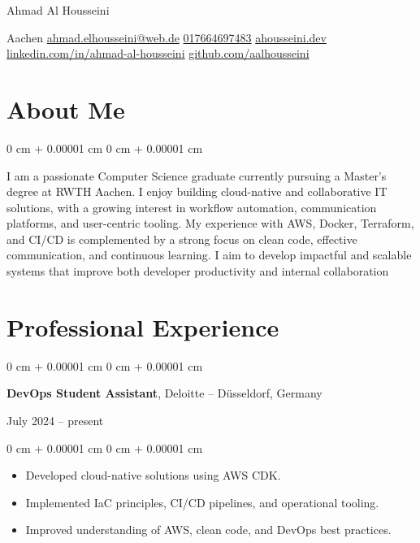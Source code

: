 \documentclass[10pt, letterpaper]{article}
\newenvironment{highlights}{
    \begin{itemize}[
        topsep=0.10 cm,
        parsep=0.10 cm,
        partopsep=0pt,
        itemsep=0pt,
        leftmargin=0 cm + 10pt
    ]
}{
    \end{itemize}
} %
\newenvironment{onecolentry}{
    \begin{adjustwidth}{
        0 cm + 0.00001 cm
    }{
        0 cm + 0.00001 cm
    }
}{
    \end{adjustwidth}
} %
\newenvironment{twocolentry}[2][]{
    \onecolentry
    \def\secondColumn{#2}
    \setcolumnwidth{\fill, 4.5 cm}
    \begin{paracol}{2}
}{
    \switchcolumn \raggedleft \secondColumn
    \end{paracol}
    \endonecolentry
} %
\newenvironment{header}{
    \setlength{\topsep}{0pt}\par\kern\topsep\centering\linespread{1.5}
}{
    \par\kern\topsep
} %
\begin{document}
    \newcommand{\AND}{\unskip
        \cleaders\copy\ANDbox\hskip\wd\ANDbox
        \ignorespaces
    }
    \newsavebox\ANDbox
    \sbox\ANDbox{$|$}

\begin{header}
    \fontsize{25 pt}{25 pt}\selectfont Ahmad Al Housseini

    \vspace{5 pt}

    \normalsize
    Aachen%
    \kern 5pt%
    \textbar\kern 5pt%
    \href{mailto:ahmad.elhousseini@web.de}{ahmad.elhousseini@web.de}%
    \kern 5pt%
    \textbar\kern 5pt%
    \href{tel:+4917664697483}{017664697483}%
    \kern 5pt%
    \textbar\kern 5pt%
    \href{https://ahousseini.dev/}{ahousseini.dev}%
    \kern 5pt%
    \textbar\kern 5pt%
    \href{https://linkedin.com/in/ahmad-al-housseini/}{linkedin.com/in/ahmad-al-housseini}%
    \kern 5pt%
    \textbar\kern 5pt%
    \href{https://github.com/aalhousseini}{github.com/aalhousseini}
\end{header}


    \vspace{5 pt - 0.3 cm}


\section{About Me}

\begin{onecolentry}
I am a passionate Computer Science graduate currently pursuing a Master's degree at RWTH Aachen. I enjoy building cloud-native and collaborative IT solutions, with a growing interest in workflow automation, communication platforms, and user-centric tooling. My experience with AWS, Docker, Terraform, and CI/CD is complemented by a strong focus on clean code, effective communication, and continuous learning. I aim to develop impactful and scalable systems that improve both developer productivity and internal collaboration
\end{onecolentry}
    

    \section{Professional Experience}

 \begin{twocolentry}{
            July 2024 – present
        }
\textbf{DevOps Student Assistant}, Deloitte -- Düsseldorf, Germany
\end{twocolentry}
\begin{onecolentry}
\begin{highlights}
\item Developed cloud-native solutions using AWS CDK.
\item Implemented IaC principles, CI/CD pipelines, and operational tooling.
\item Improved understanding of AWS, clean code, and DevOps best practices.
\end{highlights}
\end{onecolentry}
\end{document}
